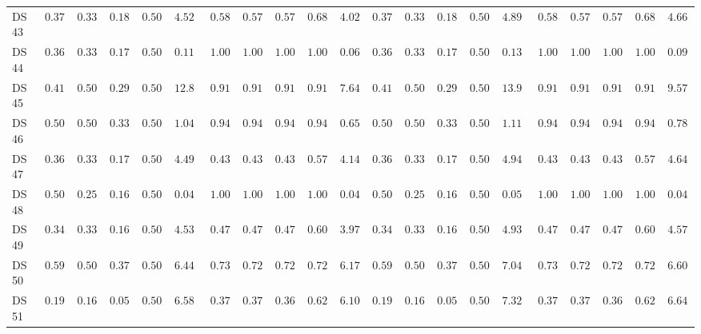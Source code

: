 {\begin{longtable}{|l|ccccc|ccccc|ccccc|ccccc|}
		DS 43 & $0.3723$ & $0.3333$ & $0.1809$ & $0.5000$ & $4.5244$ & $0.5851$ & $0.5759$ & $0.5750$ & $0.6819$ & $\boldsymbol{4.0234}$ & $0.3723$ & $0.3333$ & $0.1809$ & $0.5000$ & $4.8938$ & $0.5851$ & $0.5759$ & $0.5750$ & $0.6819$ & $4.6611$ \\
		DS 44 & $0.3667$ & $0.3333$ & $0.1789$ & $0.5000$ & $0.1178$ & $1.0000$ & $1.0000$ & $1.0000$ & $1.0000$ & $\boldsymbol{0.0684}$ & $0.3667$ & $0.3333$ & $0.1789$ & $0.5000$ & $0.1301$ & $\boldsymbol{1.0000}$ & $\boldsymbol{1.0000}$ & $\boldsymbol{1.0000}$ & $\boldsymbol{1.0000}$ & $0.0949$ \\
		DS 45 & $0.4119$ & $0.5000$ & $0.2918$ & $0.5000$ & $12.8535$ & $0.9182$ & $0.9133$ & $0.9152$ & $0.9133$ & $\boldsymbol{7.6414}$ & $0.4119$ & $0.5000$ & $0.2918$ & $0.5000$ & $13.9144$ & $0.9182$ & $0.9133$ & $0.9152$ & $0.9133$ & $9.5785$ \\
		DS 46 & $0.5000$ & $0.5000$ & $0.3333$ & $0.5000$ & $1.0468$ & $0.9444$ & $0.9444$ & $0.9443$ & $0.9444$ & $\boldsymbol{0.6549}$ & $0.5000$ & $0.5000$ & $0.3333$ & $0.5000$ & $1.1179$ & $\boldsymbol{0.9444}$ & $\boldsymbol{0.9444}$ & $\boldsymbol{0.9443}$ & $\boldsymbol{0.9444}$ & $0.7856$ \\
		DS 47 & $0.3670$ & $0.3333$ & $0.1790$ & $0.5000$ & $4.4996$ & $0.4362$ & $0.4348$ & $0.4349$ & $0.5761$ & $\boldsymbol{4.1483}$ & $0.3670$ & $0.3333$ & $0.1790$ & $0.5000$ & $4.9495$ & $0.4362$ & $0.4348$ & $0.4349$ & $0.5761$ & $4.6451$ \\
		DS 48 & $0.5000$ & $0.2500$ & $0.1667$ & $0.5000$ & $\boldsymbol{0.0426}$ & $1.0000$ & $1.0000$ & $1.0000$ & $1.0000$ & $0.0491$ & $0.5000$ & $0.2500$ & $0.1667$ & $0.5000$ & $0.0525$ & $\boldsymbol{1.0000}$ & $\boldsymbol{1.0000}$ & $\boldsymbol{1.0000}$ & $\boldsymbol{1.0000}$ & $0.0488$ \\
		DS 49 & $0.3404$ & $0.3333$ & $0.1693$ & $0.5000$ & $4.5357$ & $0.4734$ & $0.4726$ & $0.4708$ & $0.6044$ & $\boldsymbol{3.9737}$ & $0.3404$ & $0.3333$ & $0.1693$ & $0.5000$ & $4.9383$ & $0.4734$ & $0.4726$ & $0.4708$ & $0.6044$ & $4.5748$ \\
		DS 50 & $0.5956$ & $0.5000$ & $0.3733$ & $0.5000$ & $6.4498$ & $0.7378$ & $0.7252$ & $0.7263$ & $0.7252$ & $\boldsymbol{6.1706}$ & $0.5956$ & $0.5000$ & $0.3733$ & $0.5000$ & $7.0472$ & $\boldsymbol{0.7378}$ & $\boldsymbol{0.7252}$ & $\boldsymbol{0.7263}$ & $\boldsymbol{0.7252}$ & $6.6055$ \\
		DS 51 & $0.1911$ & $0.1667$ & $0.0535$ & $0.5000$ & $6.5811$ & $0.3733$ & $0.3745$ & $0.3679$ & $0.6247$ & $\boldsymbol{6.1073}$ & $0.1911$ & $0.1667$ & $0.0535$ & $0.5000$ & $7.3295$ & $0.3733$ & $0.3745$ & $0.3679$ & $0.6247$ & $6.6443$ \\

\end{longtable}}
